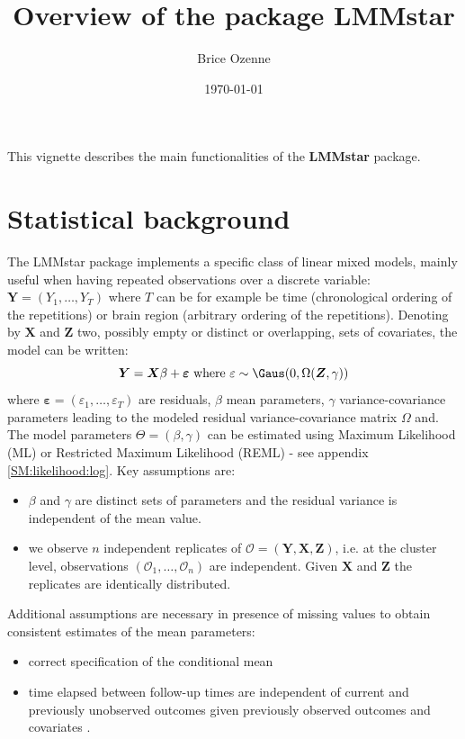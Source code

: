 \documentclass[12pt]{article}
\author{Brice Ozenne}
\date{\today}
\title{Overview of the package LMMstar}
\newcommand{\VX}{\boldsymbol{X}}
\newcommand{\VY}{\boldsymbol{Y}}
\newcommand{\VZ}{\boldsymbol{Z}}
\begin{document}
\maketitle
This vignette describes the main functionalities of the \textbf{LMMstar}
package.
\section{Statistical background}
\label{sec:orgf5b6ada}

The LMMstar package implements a specific class of linear mixed models,
mainly useful when having repeated observations over a discrete
variable: \(\VY=(Y_1,\ldots,Y_T)\) where \(T\) can be for example be
time (chronological ordering of the repetitions) or brain region
(arbitrary ordering of the repetitions). Denoting by \(\VX\) and
\(\VZ\) two, possibly empty or distinct or overlapping, sets of
covariates, the model can be written:
\[ \VY = \VX \beta + \boldsymbol{\varepsilon} \text{ where } \varepsilon \sim \Gaus(0,\Omega(\VZ,\gamma)) \]
where \(\boldsymbol{\varepsilon} =
(\varepsilon_1,\ldots,\varepsilon_T)\) are residuals, \(\beta\) mean
parameters, \(\gamma\) variance-covariance parameters leading to the
modeled residual variance-covariance matrix \(\Omega\) and. The model
parameters \(\Theta = (\beta,\gamma)\) can be estimated using Maximum
Likelihood (ML) or Restricted Maximum Likelihood (REML) - see appendix
\ref{SM:likelihood:log}. Key assumptions are:
\begin{itemize}
\item \(\beta\) and \(\gamma\) are distinct sets of parameters and the
residual variance is independent of the mean value.
\item we observe \(n\) independent replicates of
\(\mathcal{O}=(\VY,\VX,\VZ)\), i.e. at the cluster level,
observations \(\left(\mathcal{O}_1,\ldots,\mathcal{O}_n\right)\) are
independent. Given \(\VX\) and \(\VZ\) the replicates are
identically distributed.
\end{itemize}

Additional assumptions are necessary in presence of missing values to
obtain consistent estimates of the mean parameters:
\begin{itemize}
\item correct specification of the conditional mean
\item time elapsed between follow-up times are independent of current and
previously unobserved outcomes given previously observed outcomes
and covariates \citep{lipsitz2002parameter}.
\end{itemize}
\end{document}
